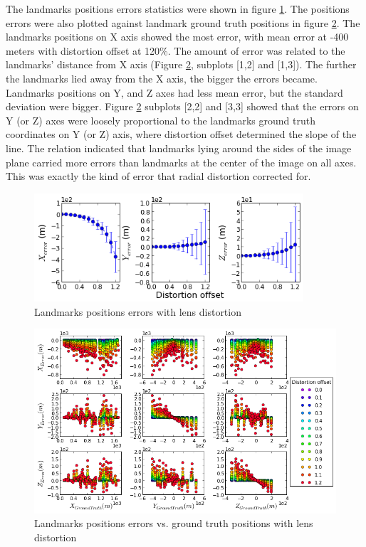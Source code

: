 The landmarks positions errors statistics were shown in figure
\ref{fig:simfig45}. The positions errors were also plotted against
landmark ground truth positions in figure \ref{fig:simfig46}. The
landmarks positions on X axis showed the most error, with mean error
at -400 meters with distortion offset at 120\%. The amount of error
was related to the landmarks' distance from X axis (Figure
\ref{fig:simfig46}, subplots [1,2] and [1,3]). The further the
landmarks lied away from the X axis, the bigger the errors became.
Landmarks positions on Y, and Z axes had less mean error, but the
standard deviation were bigger. Figure \ref{fig:simfig46} subplots
[2,2] and [3,3] showed that the errors on Y (or Z) axes were loosely
proportional to the landmarks ground truth coordinates on Y (or Z)
axis, where distortion offset determined the slope of the line. The
relation indicated that landmarks lying around the sides of the image
plane carried more errors than landmarks at the center of the image on
all axes. This was exactly the kind of error that radial distortion
corrected for.

\begin{figure}[h]%
  \centering
  \includegraphics[width=10cm,keepaspectratio=true]{./Figures/SimulationFigures/Figure45.png}
  \caption{Landmarks positions errors with lens distortion}
  \label{fig:simfig45}
\end{figure}

\begin{figure}[h] %
  \centering
  \includegraphics[width=13cm,keepaspectratio=true]{./Figures/SimulationFigures/Figure46.png}
  \caption{Landmarks positions errors vs. ground truth positions with lens distortion}
  \label{fig:simfig46}
\end{figure}
\FloatBarrier

